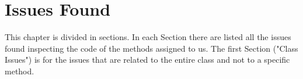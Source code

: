 \documentclass[../../codeInspection.tex]{subfiles}
\begin{document}
	\chapter{Issues Found}

		This chapter is divided in sections.
		In each Section there are listed all the issues found inspecting the code of the methods assigned to us. The first Section ("Class Issues") is for the issues that are related to the entire class and not to a specific method.

	

	

	

	

	

	
\end{document}
